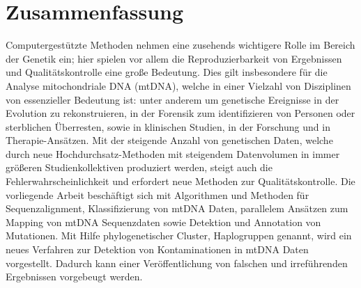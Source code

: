 \section*{Zusammenfassung}
Computergestützte Methoden nehmen eine zusehends wichtigere Rolle im Bereich der Genetik ein; hier spielen vor allem die Reproduzierbarkeit von Ergebnissen und Qualit\"atskontrolle eine gro{\ss}e Bedeutung. Dies gilt insbesondere für die Analyse mitochondriale DNA (mtDNA), welche in einer Vielzahl von Disziplinen von essenzieller Bedeutung ist: unter anderem um genetische Ereignisse in der Evolution zu rekonstruieren, in der Forensik zum identifizieren von Personen oder sterblichen \"Uberresten, sowie in klinischen Studien, in der Forschung und in Therapie-Ans\"atzen. Mit der steigende Anzahl von genetischen Daten, welche durch neue Hochdurchsatz-Methoden mit steigendem Datenvolumen in immer gr\"o{\ss}eren Studienkollektiven produziert werden, steigt auch die Fehlerwahrscheinlichkeit und erfordert neue Methoden zur Qualit\"atskontrolle. Die vorliegende Arbeit besch\"aftigt sich mit Algorithmen und Methoden für Sequenzalignment, Klassifizierung von mtDNA Daten, parallelem Ansätzen zum Mapping von mtDNA Sequenzdaten sowie Detektion und Annotation von Mutationen. Mit Hilfe phylogenetischer Cluster, Haplogruppen genannt, wird ein neues Verfahren zur Detektion von Kontaminationen in mtDNA Daten vorgestellt. Dadurch kann einer Ver\"offentlichung von falschen und irref\"uhrenden Ergebnissen vorgebeugt werden. 




